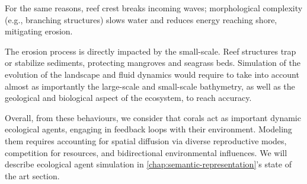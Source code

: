 
For the same reasons, reef crest breaks incoming waves; morphological complexity (e.g., branching structures) slows water and reduces energy reaching shore, mitigating erosion.

The erosion process is directly impacted by the small-scale. Reef structures trap or stabilize sediments, protecting mangroves and seagrass beds. Simulation of the evolution of the landscape and fluid dynamics would require to take into account almost as importantly the large-scale and small-scale bathymetry, as well as the geological and biological aspect of the ecosystem, to reach accuracy.



Overall, from these behaviours, we consider that corals act as important dynamic ecological agents, engaging in feedback loops with their environment. Modeling them requires accounting for spatial diffusion via diverse reproductive modes, competition for resources, and bidirectional environmental influences. We will describe ecological agent simulation in \cref{chap:semantic-representation}'s state of the art section.


